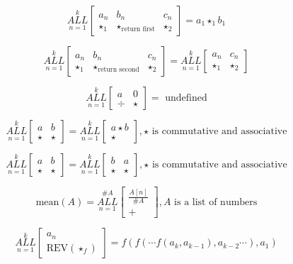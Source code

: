 \documentclass{article}
\begin{document}
$$\underset{n=1}{\overset{k}{ALL}} \begin{bmatrix}
a_n & b_n & c_n\\
\star_1 & \star_{\text{return first}} & \star_2
\end{bmatrix} = a_1 \star_1 b_1$$

$$\underset{n=1}{\overset{k}{ALL}} \begin{bmatrix}
a_n & b_n & c_n\\
\star_1 & \star_{\text{return second}} & \star_2
\end{bmatrix} = \underset{n=1}{\overset{k}{ALL}} \begin{bmatrix}
a_n & c_n\\
\star_1 & \star_2
\end{bmatrix}$$

$$\underset{n=1}{\overset{k}{ALL}} \begin{bmatrix}
a & 0\\
\div & \star
\end{bmatrix}=\text{ undefined}$$

$$\underset{n=1}{\overset{k}{ALL}} \begin{bmatrix}
a & b\\
\star & \star
\end{bmatrix}=\underset{n=1}{\overset{k}{ALL}} \begin{bmatrix}
a \star b\\
\star
\end{bmatrix}, \star \text{ is commutative and associative}$$

$$\underset{n=1}{\overset{k}{ALL}} \begin{bmatrix}
a & b\\
\star & \star
\end{bmatrix}=\underset{n=1}{\overset{k}{ALL}} \begin{bmatrix}
b & a\\
\star & \star
\end{bmatrix}, \star \text{ is commutative and associative}$$


$$\text{mean}(A) = \underset{n=1}{\overset{\# A}{ALL}} \begin{bmatrix}
\frac{A[n]}{\# A}\\
+
\end{bmatrix}, A \text{ is a list of numbers}$$

$$\underset{n=1}{\overset{k}{ALL}} \begin{bmatrix}
a_n \\
\text{REV} (\star_f)
\end{bmatrix} = f( f( \cdots f(a_k, a_{k-1}), a_{k-2} \cdots ), a_1)$$
\end{document}
